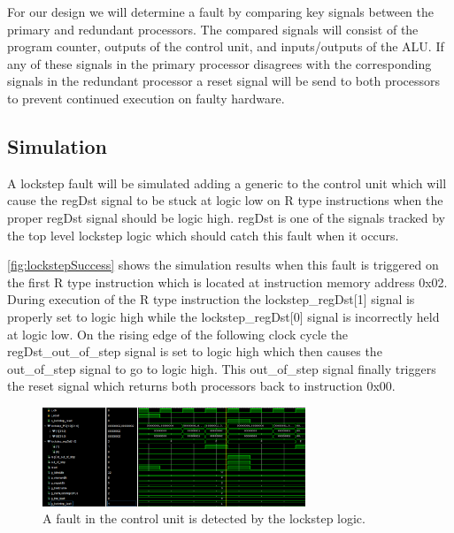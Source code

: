 \documentclass[12pt]{article}
\begin{document}
For our design we will determine a fault by comparing key signals between the primary and redundant processors. The compared signals will consist of the program counter, outputs of the control unit, and inputs/outputs of the ALU. If any of these signals in the primary processor disagrees with the corresponding signals in the redundant processor a reset signal will be send to both processors to prevent continued execution on faulty hardware.


\subsection{Simulation}
A lockstep fault will be simulated adding a generic to the control unit which will cause the regDst signal to be stuck at logic low on R type instructions when the proper regDst signal should be logic high. regDst is one of the signals tracked by the top level lockstep logic which should catch this fault when it occurs.

\autoref{fig:lockstepSuccess} shows the simulation results when this fault is triggered on the first R type instruction which is located at instruction memory address 0x02. During execution of the R type instruction the lockstep\_regDst[1] signal is properly set to logic high while the lockstep\_regDst[0] signal is incorrectly held at logic low. On the rising edge of the following clock cycle the regDst\_out\_of\_step signal is set to logic high which then causes the out\_of\_step signal to go to logic high. This out\_of\_step signal finally triggers the reset signal which returns both processors back to instruction 0x00.

\begin{figure}[H]
    \centering
    \includegraphics[width=0.7\textwidth]{lockstepSuccess.PNG}
    \caption{A fault in the control unit is detected by the lockstep logic.}
    \label{fig:lockstepSuccess}
\end{figure}
\end{document}
